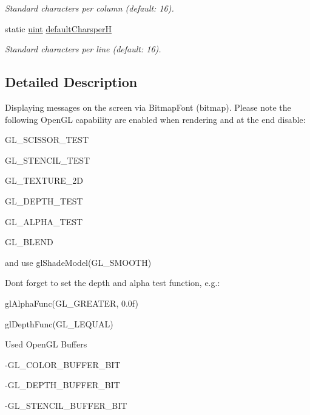 \begin{DoxyCompactItemize}
\begin{DoxyCompactList}\small\item\em Standard characters per column (default: 16). \item\end{DoxyCompactList}\item 
\hypertarget{class_f2_c_1_1_font_sprite_a2f7ed6629876bb340c5b3121d0c3a2b0}{
static \hyperlink{namespace_f2_c_a58be2bac9eb3e3c99cb41b6008bf4fae}{uint} \hyperlink{class_f2_c_1_1_font_sprite_a2f7ed6629876bb340c5b3121d0c3a2b0}{defaultCharsperH}}
\label{class_f2_c_1_1_font_sprite_a2f7ed6629876bb340c5b3121d0c3a2b0}

\begin{DoxyCompactList}\small\item\em Standard characters per line (default: 16). \item\end{DoxyCompactList}\end{DoxyCompactItemize}


\subsection{Detailed Description}
Displaying messages on the screen via BitmapFont (bitmap). Please note the following OpenGL capability are enabled when rendering and at the end disable: \par
 GL\_\-SCISSOR\_\-TEST \par
 GL\_\-STENCIL\_\-TEST \par
 GL\_\-TEXTURE\_\-2D \par
 GL\_\-DEPTH\_\-TEST \par
 GL\_\-ALPHA\_\-TEST \par
 GL\_\-BLEND \par
 and use glShadeModel(GL\_\-SMOOTH) \par
 \par
 Dont forget to set the depth and alpha test function, e.g.: \par
 glAlphaFunc(GL\_\-GREATER, 0.0f) \par
 glDepthFunc(GL\_\-LEQUAL) \par
 \par
 Used OpenGL Buffers \par
 -\/GL\_\-COLOR\_\-BUFFER\_\-BIT \par
 -\/GL\_\-DEPTH\_\-BUFFER\_\-BIT \par
 -\/GL\_\-STENCIL\_\-BUFFER\_\-BIT \par
 

